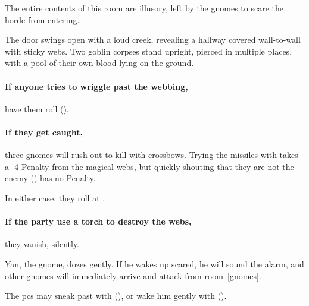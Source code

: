 \begin{multicols}{2}
{}


The entire contents of this room are illusory, left by the gnomes to scare the horde from entering.

\begin{boxtext}
  The door swings open with a loud creek, revealing a hallway covered wall-to-wall with sticky webs.
  Two goblin corpses stand upright, pierced in multiple places, with a pool of their own blood lying on the ground.
\end{boxtext}

\paragraph{If anyone tries to wriggle past the webbing,}
have them roll  (\tn[12]).

\paragraph{If they get caught,}
three gnomes will rush out to kill with crossbows.
Trying the missiles with  takes a -4 Penalty from the magical webs, but quickly shouting that they are not the enemy ()  has no Penalty.

In either case, they roll at \tn[10].

\paragraph{If the party use a torch to destroy the webs,}
they vanish, silently.



Yan, the gnome, dozes gently.
If he wakes up scared, he will sound the alarm, and other gnomes will immediately arrive and attack from room~\ref{gnomes}.

The \glspl{pc} may sneak past with  (\tn[10]), or wake him gently with  (\tn[8]).



\end{multicols}
